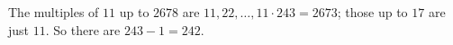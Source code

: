 The multiples of $11$ up to $2678$ are $11,22,\dots,11\cdot243=2673$; those up to $17$ are just $11$. So there are $243-1=\boxed{242}$.
